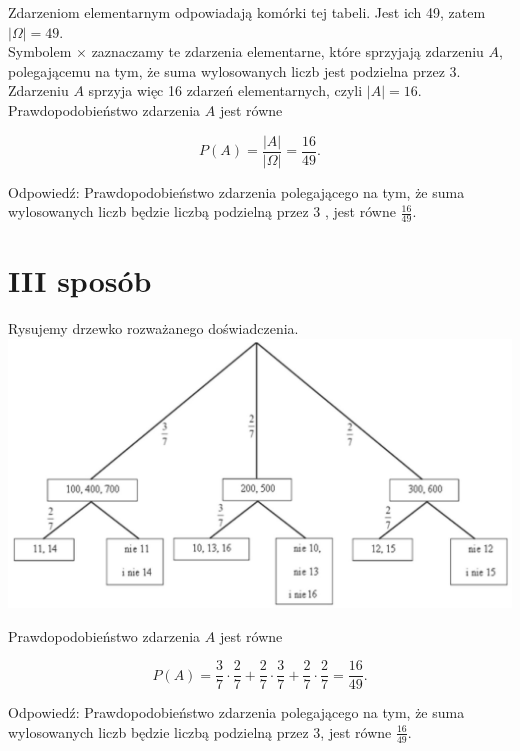 \documentclass[10pt]{article}
\begin{document}
Zdarzeniom elementarnym odpowiadają komórki tej tabeli. Jest ich 49, zatem $|\Omega|=49$.\\
Symbolem $\times$ zaznaczamy te zdarzenia elementarne, które sprzyjają zdarzeniu $A$, polegającemu na tym, że suma wylosowanych liczb jest podzielna przez 3.\\
Zdarzeniu $A$ sprzyja więc 16 zdarzeń elementarnych, czyli $|A|=16$.\\
Prawdopodobieństwo zdarzenia $A$ jest równe

$$
P(A)=\frac{|A|}{|\Omega|}=\frac{16}{49} .
$$

Odpowiedź: Prawdopodobieństwo zdarzenia polegającego na tym, że suma wylosowanych liczb będzie liczbą podzielną przez 3 , jest równe $\frac{16}{49}$.

\section*{III sposób}
Rysujemy drzewko rozważanego doświadczenia.\\
\includegraphics[max width=\textwidth, center]{2025_02_07_a74eed68a1a2147a06fdg-20}

Prawdopodobieństwo zdarzenia $A$ jest równe

$$
P(A)=\frac{3}{7} \cdot \frac{2}{7}+\frac{2}{7} \cdot \frac{3}{7}+\frac{2}{7} \cdot \frac{2}{7}=\frac{16}{49} .
$$

Odpowiedź: Prawdopodobieństwo zdarzenia polegającego na tym, że suma wylosowanych liczb będzie liczbą podzielną przez 3, jest równe $\frac{16}{49}$.
\end{document}
